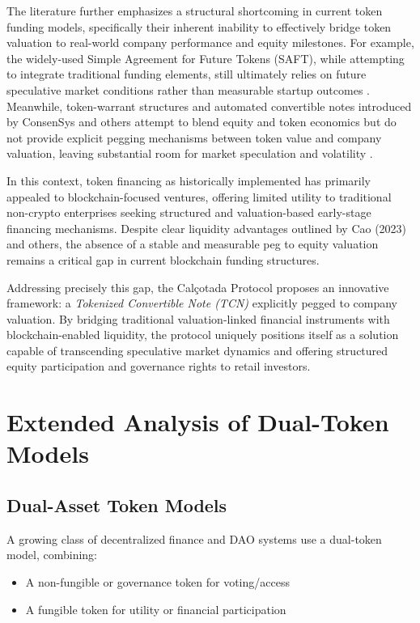 \documentclass[conference]{IEEEtran}
\begin{document}
The literature further emphasizes a structural shortcoming in current token funding models, specifically their inherent inability to effectively bridge token valuation to real-world company performance and equity milestones. For example, the widely-used Simple Agreement for Future Tokens (SAFT), while attempting to integrate traditional funding elements, still ultimately relies on future speculative market conditions rather than measurable startup outcomes \cite{mendelson2019saft}. Meanwhile, token-warrant structures and automated convertible notes introduced by ConsenSys and others attempt to blend equity and token economics but do not provide explicit pegging mechanisms between token value and company valuation, leaving substantial room for market speculation and volatility \cite{lw2019token}.

In this context, token financing as historically implemented has primarily appealed to blockchain-focused ventures, offering limited utility to traditional non-crypto enterprises seeking structured and valuation-based early-stage financing mechanisms. Despite clear liquidity advantages outlined by Cao (2023) and others, the absence of a stable and measurable peg to equity valuation remains a critical gap in current blockchain funding structures.

Addressing precisely this gap, the Calçotada Protocol proposes an innovative framework: a \textit{Tokenized Convertible Note (TCN)} explicitly pegged to company valuation. By bridging traditional valuation-linked financial instruments with blockchain-enabled liquidity, the protocol uniquely positions itself as a solution capable of transcending speculative market dynamics and offering structured equity participation and governance rights to retail investors.

\section{Extended Analysis of Dual-Token Models}

\subsection{Dual-Asset Token Models}

A growing class of decentralized finance and DAO systems use a dual-token model, combining:

\begin{itemize}
    \item A non-fungible or governance token for voting/access
    \item A fungible token for utility or financial participation
\end{itemize}
\end{document}
